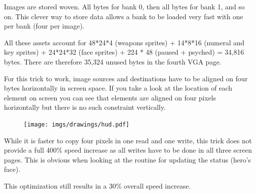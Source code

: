  Images are stored woven. All bytes for bank 0, then all bytes for bank 1, and so on. This clever way to store data allows a bank to be loaded very fast with one  per bank (four  per image).\\
\par
All these assets account for 48*24*4 (weapons sprites) + 14*8*16 (numeral and key sprites) + 24*24*32 (face sprites) + 224 * 48 (paused + psyched) = 34,816 bytes. There are therefore 35,324 unused bytes in the fourth VGA page.\\
\par
For this trick to work, image sources and destinations have to be aligned on four bytes horizontally in screen space. If you take a look at the location of each element on screen you can see that elements are aligned on four pixels horizontally but there is no such constraint vertically.
\begin{figure}[H]
  \centering
 \texttt{[image: imgs/drawings/hud.pdf]}
\end{figure}

While it is faster to copy four pixels in one read and one write, this trick does not provide a full 400\% speed increase as all writes have to be done in all three screen pages. This is obvious when looking at the routine for updating the status (hero's face).\\
\par
\begin{minipage}{\textwidth}

\end{minipage}
\par
This optimization still results in a 30\% overall speed increase.\\
\par











